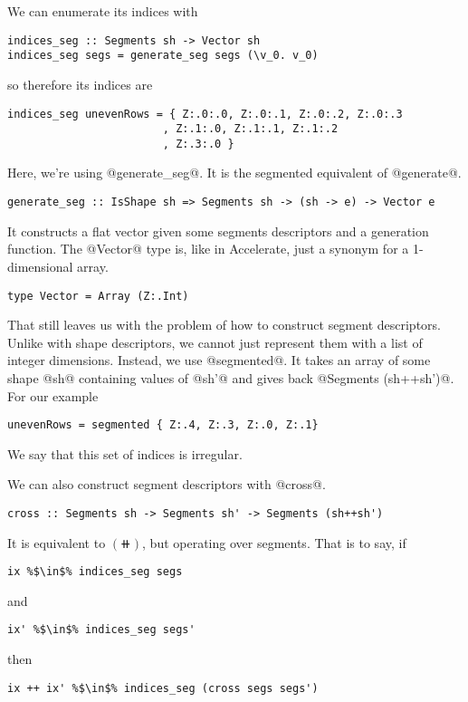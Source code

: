 We can enumerate its indices with
%
\begin{lstlisting}[style=ndp]
indices_seg :: Segments sh -> Vector sh
indices_seg segs = generate_seg segs (\v_0. v_0)
\end{lstlisting}
%
so therefore its indices are
%
\begin{lstlisting}[style=ndp]
indices_seg unevenRows = { Z:.0:.0, Z:.0:.1, Z:.0:.2, Z:.0:.3
                        , Z:.1:.0, Z:.1:.1, Z:.1:.2
                        , Z:.3:.0 }
\end{lstlisting}
%
Here, we're using @generate_seg@. It is the segmented equivalent of @generate@.
%
\begin{lstlisting}[style=ndp]
generate_seg :: IsShape sh => Segments sh -> (sh -> e) -> Vector e
\end{lstlisting}
%
It constructs a flat vector given some segments descriptors and a generation function. The @Vector@ type is, like in Accelerate, just a synonym for a 1-dimensional array.
%
\begin{lstlisting}[style=ndp]
type Vector = Array (Z:.Int)
\end{lstlisting}

That still leaves us with the problem of how to construct segment descriptors. Unlike with shape descriptors, we cannot just represent them with a list of integer dimensions. Instead, we use @segmented@. It takes an array of some shape @sh@ containing values of @sh'@ and gives back @Segments (sh++sh')@. For our example
%
\begin{lstlisting}[style=ndp]
unevenRows = segmented { Z:.4, Z:.3, Z:.0, Z:.1}
\end{lstlisting}
%
We say that this set of indices is irregular.

We can also construct segment descriptors with @cross@.
%
\begin{lstlisting}[style=ndp]
cross :: Segments sh -> Segments sh' -> Segments (sh++sh')
\end{lstlisting}
%
It is equivalent to $(\doubleplus)$, but operating over segments. That is to say, if
%
\begin{lstlisting}[style=ndp]
ix %$\in$% indices_seg segs
\end{lstlisting}
%
and
%
\begin{lstlisting}[style=ndp]
ix' %$\in$% indices_seg segs'
\end{lstlisting}
%
then
%
\begin{lstlisting}[style=ndp]
ix ++ ix' %$\in$% indices_seg (cross segs segs')
\end{lstlisting}

